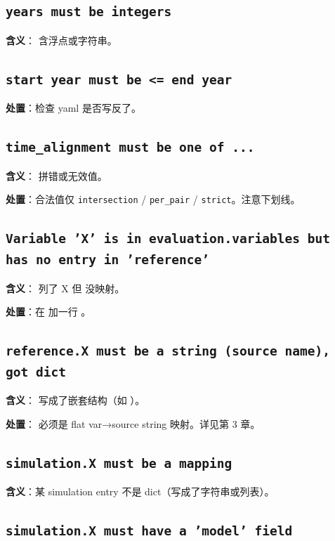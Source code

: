 \subsection{\texttt{years must be integers}}

\textbf{含义}： 含浮点或字符串。

\subsection{\texttt{start year must be <= end year}}

\textbf{处置}：检查 yaml 是否写反了。

\subsection{\texttt{time\_alignment must be one of ...}}

\textbf{含义}： 拼错或无效值。

\textbf{处置}：合法值仅 \texttt{intersection} / \texttt{per\_pair} / \texttt{strict}。注意下划线。

\subsection{\texttt{Variable 'X' is in evaluation.variables but has no entry in 'reference'}}

\textbf{含义}： 列了 X 但  没映射。

\textbf{处置}：在  加一行 。

\subsection{\texttt{reference.X must be a string (source name), got dict}}

\textbf{含义}： 写成了嵌套结构（如 ）。

\textbf{处置}： 必须是 flat var→source string 映射。详见第 3 章。

\subsection{\texttt{simulation.X must be a mapping}}

\textbf{含义}：某 simulation entry 不是 dict（写成了字符串或列表）。

\subsection{\texttt{simulation.X must have a 'model' field}}

